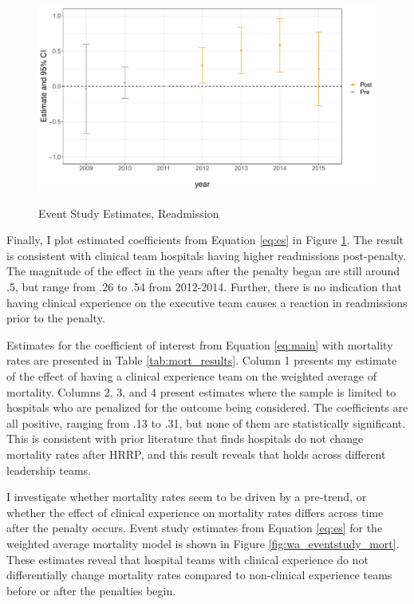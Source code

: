 \documentclass[12pt]{article}
\begin{document}
    \begin{figure}[ht!]
        \caption{Event Study Estimates, Readmission}
        \includegraphics[scale=.5]{Objects/read_es_graph.pdf}
        \label{fig:wa_eventstudy}
    \end{figure}

    Finally, I plot estimated coefficients from Equation \ref{eq:es} in Figure \ref{fig:wa_eventstudy}. The result is consistent with clinical team hospitals having higher readmissions post-penalty. The magnitude of the effect in the years after the penalty began are still around .5, but range from .26 to .54 from 2012-2014. Further, there is no indication that having clinical experience on the executive team causes a reaction in readmissions prior to the penalty. 


    Estimates for the coefficient of interest from Equation \ref{eq:main} with mortality rates are presented in Table \ref{tab:mort_results}. Column 1 presents my estimate of the effect of having a clinical experience team on the weighted average of mortality. Columns 2, 3, and 4 present estimates where the sample is limited to hospitals who are penalized for the outcome being considered. The coefficients are all positive, ranging from .13 to .31, but none of them are statistically significant. This is consistent with prior literature that finds hospitals do not change mortality rates after HRRP, and this result reveals that holds across different leadership teams. 



    I investigate whether mortality rates seem to be driven by a pre-trend, or whether the effect of clinical experience on mortality rates differs across time after the penalty occurs. Event study estimates from Equation \ref{eq:es} for the weighted average mortality model is shown in Figure \ref{fig:wa_eventstudy_mort}. These estimates reveal that hospital teams with clinical experience do not differentially change mortality rates compared to non-clinical experience teams before or after the penalties begin. 
\end{document}
